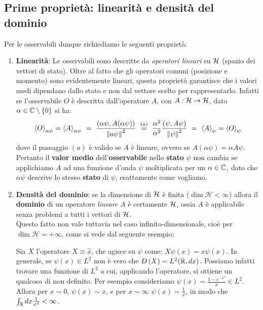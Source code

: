 \documentclass[FisicaTeorica.tex]{subfiles}
\begin{document}
\subsection{Prime proprietà: linearità e densità del dominio}
Per le osservabili dunque richiediamo le seguenti proprietà:
\begin{enumerate}
    \item \textbf{Linearità}: Le osservabili sono descritte da \emph{operatori lineari} su $\mathcal{H}$ (spazio dei vettori di stato).
    Oltre al fatto che gli operatori comuni (posizione e momento) sono evidentemente lineari, questa proprietà garantisce che i valori medi dipendano dallo stato e non dal vettore scelto per rappresentarlo. Infatti se l'osservabile $O$ è descritta dall'operatore $A$, con $A:\mathcal{H} \to \mathcal{H}$, dato $\alpha \in \mathbb{C}\setminus \{0\}$ si ha: 
    \[
    \avg{O}_{\alpha \psi} = \avg{A}_{\alpha \psi}  \ = \ \frac{(\alpha\psi,A(\alpha\psi))}{\norm{a\psi}^2} \ \overset{(a)}{=} \ \frac{\alpha^2}{\alpha^2} \frac{(\psi,A\psi)}{\norm{\psi}^2} \ = \ \avg{A}_\psi = \avg{O}_\psi
    \]
    dove il passaggio $(a)$ è valido se $A$ è lineare, ovvero se $A(\alpha \psi) = \alpha A\psi$. 
    Pertanto il \textbf{valor medio} dell'\textbf{osservabile} nello \textbf{stato} $\psi$ non cambia se applichiamo $A$ ad una funzione d'onda $\psi$ moltiplicata per un $\alpha \in \mathbb{C}$, dato che $\alpha\psi$ descrive lo stesso \textbf{stato} di $\psi$, esattamente come vogliamo.
	\item \textbf{Densità del dominio}:  se la dimensione di $\mathcal{H}$ è finita ($\dim{\mathcal{H}<\infty}$) allora il \textbf{dominio} di un operatore \textit{lineare} $A$ è certamente $\mathcal{H}$, ossia $A$ è applicabile senza problemi a tutti i vettori di $\mathcal{H}$.\\
	Questo fatto non vale tuttavia nel caso infinito-dimensionale, cioè per $\dim{\mathcal{H}=+\infty}$, come si vede dal seguente esempio:
	\begin{es} Sia $X$ l'operatore  $X\equiv \hat{x}$, che agisce su $\psi$ come: $X\psi \left(x\right)=x\psi \left(x\right)$.
	In generale, se $\psi \left(x\right)\in L^2$ non è vero che $D\left(X\right)=L^2(\mathbb{R}, dx)$.
	Possiamo infatti trovare una funzione di $L^2$ a cui, applicando l'operatore, si ottiene un qualcosa di non definito. Per esempio consideriamo $\psi \left(x\right)=\frac{1-e^{-x^2}}{x}\in L^2$. Allora per $x\sim 0$, $\psi \left(x\right)\sim x$, e per $x\sim \infty$  $\psi \left(x\right)\sim \frac{1}{x}$, in modo che $\int_{\mathbb{R}} dx \frac{1}{x^2}<\infty$.

\end{es}
\end{enumerate}
\end{document}
